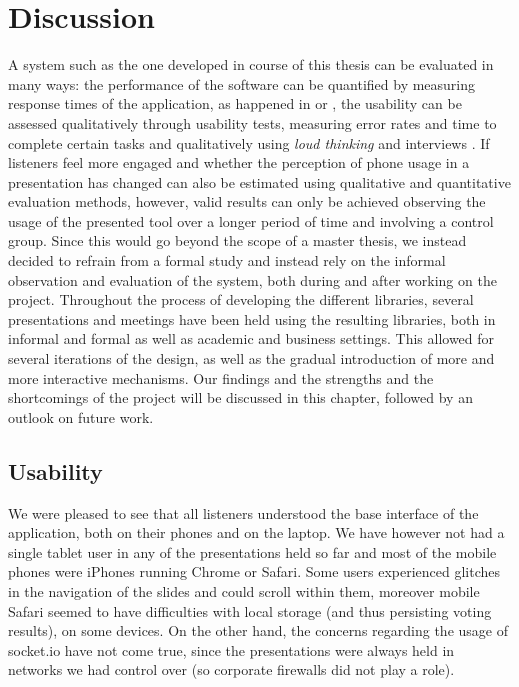 \chapter{Discussion}
\label{cha:discussion}

A system such as the one developed in course of this thesis can be evaluated in many ways: the performance of the software can be quantified by measuring response times of the application, as happened in \cite{Niwa:Web-presentation-powerpoint} or \cite{Inoue:RealTimeQuestionnaire}, the usability can be assessed qualitatively through usability tests, measuring error rates and time to complete certain tasks and qualitatively using \emph{loud thinking} and interviews \cite{Reindl:automatisierte-user-interface-evaluierung}. If listeners feel more engaged and whether the perception of phone usage in a presentation has changed can also be estimated using qualitative and quantitative evaluation methods, however, valid results can only be achieved observing the usage of the presented tool over a longer period of time and involving a control group. Since this would go beyond the scope of a master thesis, we instead decided to refrain from a formal study and instead rely on the informal observation and evaluation of the system, both during and after working on the project.
Throughout the process of developing the different libraries, several presentations and meetings have been held using the resulting libraries, both in informal and formal as well as academic and business settings. This allowed for several iterations of the design, as well as the gradual introduction of more and more interactive mechanisms. Our findings and the strengths and the shortcomings of the project will be discussed in this chapter, followed by an outlook on future work.

\section{Usability}
We were pleased to see that all listeners understood the base interface of the application, both on their phones and on the laptop. We have however not had a single tablet user in any of the presentations held so far and most of the mobile phones were iPhones running Chrome or Safari. Some users experienced glitches in the navigation of the slides and could scroll within them, moreover mobile Safari seemed to have difficulties with local storage (and thus persisting voting results), on some devices. On the other hand, the concerns regarding the usage of socket.io have not come true, since the presentations were always held in networks we had control over (so corporate firewalls did not play a role).

